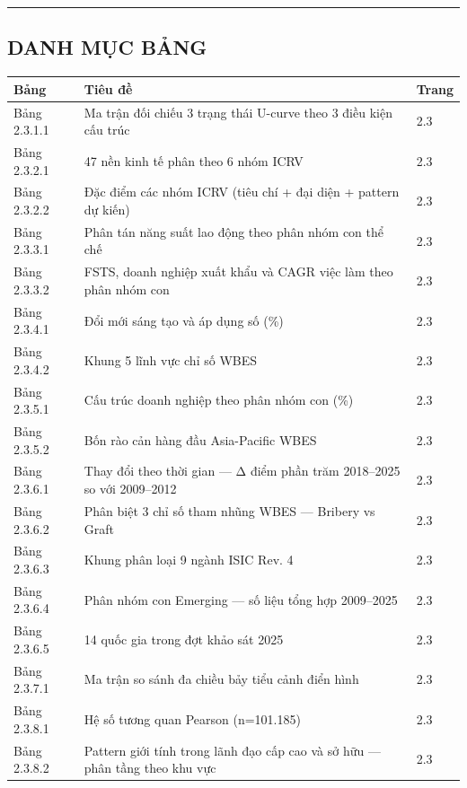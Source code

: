 \documentclass[12pt,a4paper]{article}
\begin{document}
\begin{center}\rule{0.5\linewidth}{0.5pt}\end{center}

\hypertarget{danh-mux1ee5c-bux1ea3ng}{%
\subsection{DANH MỤC BẢNG}\label{danh-mux1ee5c-bux1ea3ng}}

\begin{longtable}[]{@{}lll@{}}
\toprule\noalign{}
Bảng & Tiêu đề & Trang \\
\midrule\noalign{}
\endhead
\bottomrule\noalign{}
\endlastfoot
Bảng 2.3.1.1 & Ma trận đối chiếu 3 trạng thái U-curve theo 3 điều kiện
cấu trúc & 2.3 \\
Bảng 2.3.2.1 & 47 nền kinh tế phân theo 6 nhóm ICRV & 2.3 \\
Bảng 2.3.2.2 & Đặc điểm các nhóm ICRV (tiêu chí + đại diện + pattern dự
kiến) & 2.3 \\
Bảng 2.3.3.1 & Phân tán năng suất lao động theo phân nhóm con thể chế &
2.3 \\
Bảng 2.3.3.2 & FSTS, doanh nghiệp xuất khẩu và CAGR việc làm theo phân
nhóm con & 2.3 \\
Bảng 2.3.4.1 & Đổi mới sáng tạo và áp dụng số (\%) & 2.3 \\
Bảng 2.3.4.2 & Khung 5 lĩnh vực chỉ số WBES & 2.3 \\
Bảng 2.3.5.1 & Cấu trúc doanh nghiệp theo phân nhóm con (\%) & 2.3 \\
Bảng 2.3.5.2 & Bốn rào cản hàng đầu Asia-Pacific WBES & 2.3 \\
Bảng 2.3.6.1 & Thay đổi theo thời gian --- Δ điểm phần trăm 2018--2025
so với 2009--2012 & 2.3 \\
Bảng 2.3.6.2 & Phân biệt 3 chỉ số tham nhũng WBES --- Bribery vs Graft &
2.3 \\
Bảng 2.3.6.3 & Khung phân loại 9 ngành ISIC Rev. 4 & 2.3 \\
Bảng 2.3.6.4 & Phân nhóm con Emerging --- số liệu tổng hợp 2009--2025 &
2.3 \\
Bảng 2.3.6.5 & 14 quốc gia trong đợt khảo sát 2025 & 2.3 \\
Bảng 2.3.7.1 & Ma trận so sánh đa chiều bảy tiểu cảnh điển hình & 2.3 \\
Bảng 2.3.8.1 & Hệ số tương quan Pearson (n=101.185) & 2.3 \\
Bảng 2.3.8.2 & Pattern giới tính trong lãnh đạo cấp cao và sở hữu ---
phân tầng theo khu vực & 2.3 \\
\end{longtable}
\end{document}
